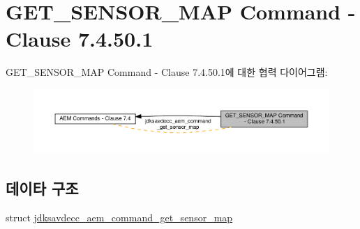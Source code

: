 \hypertarget{group__command__get__sensor__map}{}\section{G\+E\+T\+\_\+\+S\+E\+N\+S\+O\+R\+\_\+\+M\+AP Command -\/ Clause 7.4.50.1}
\label{group__command__get__sensor__map}
G\+E\+T\+\_\+\+S\+E\+N\+S\+O\+R\+\_\+\+M\+AP Command -\/ Clause 7.4.50.1에 대한 협력 다이어그램\+:
\nopagebreak
\begin{figure}[H]
\begin{center}
\leavevmode
\includegraphics[width=350pt]{group__command__get__sensor__map}
\end{center}
\end{figure}
\subsection*{데이타 구조}
\begin{DoxyCompactItemize}
\item 
struct \hyperlink{structjdksavdecc__aem__command__get__sensor__map}{jdksavdecc\+\_\+aem\+\_\+command\+\_\+get\+\_\+sensor\+\_\+map}
\end{DoxyCompactItemize}
